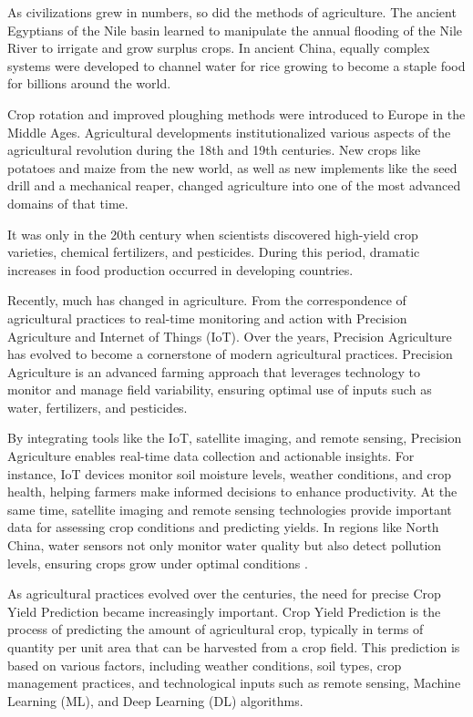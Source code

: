 \documentclass[conference]{IEEEtran}
\begin{document}
As civilizations grew in numbers, so did the methods of agriculture. The ancient Egyptians of the Nile basin learned to manipulate the annual flooding of the Nile River to irrigate and grow surplus crops. In ancient China, equally complex systems were developed to channel water for rice growing to become a staple food for billions around the world.

Crop rotation and improved ploughing methods were introduced to Europe in the Middle Ages. Agricultural developments institutionalized various aspects of the agricultural revolution during the 18th and 19th centuries. New crops like potatoes and maize from the new world, as well as new implements like the seed drill and a mechanical reaper, changed agriculture into one of the most advanced domains of that time.

It was only in the 20th century when scientists discovered high-yield crop varieties, chemical fertilizers, and pesticides. During this period, dramatic increases in food production occurred in developing countries.

Recently, much has changed in agriculture. From the correspondence of agricultural practices to real-time monitoring and action with Precision Agriculture and Internet of Things (IoT). Over the years, Precision Agriculture has evolved to become a cornerstone of modern agricultural practices. Precision Agriculture is an advanced farming approach that leverages technology to monitor and manage field variability, ensuring optimal use of inputs such as water, fertilizers, and pesticides. 

By integrating tools like the IoT, satellite imaging, and remote sensing, Precision Agriculture enables real-time data collection and actionable insights. For instance, IoT devices monitor soil moisture levels, weather conditions, and crop health, helping farmers make informed decisions to enhance productivity. At the same time, satellite imaging and remote sensing technologies provide important data for assessing crop conditions and predicting yields. In regions like North China, water sensors not only monitor water quality but also detect pollution levels, ensuring crops grow under optimal conditions \cite{b2}.

As agricultural practices evolved over the centuries, the need for precise Crop Yield Prediction became increasingly important. Crop Yield Prediction is the process of predicting the amount of agricultural crop, typically in terms of quantity per unit area that can be harvested from a crop field. This prediction is based on various factors, including weather conditions, soil types, crop management practices, and technological inputs such as remote sensing, Machine Learning (ML), and Deep Learning (DL) algorithms.
\end{document}
